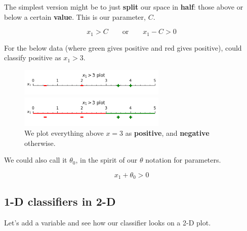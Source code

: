         The simplest version might be to just \textbf{split} our space in \textbf{half}: those above or below a certain \textbf{value}. This is our parameter, $C$.
        
        \begin{equation}
            x_1 > C \qquad \text{or} \qquad x_1 - C > 0
        \end{equation}
        
        \miniex For the below data (where green gives positive and red gives positive), could classify positive as $x_1>3$.
        
        \begin{figure}[H]
            \centering
            \includegraphics[width=70mm,scale=0.4]{images/classification_images/x1_1d_plot_points.png}

            \includegraphics[width=70mm,scale=0.4]{images/classification_images/x1_1d_plot.png}
            
            \caption*{We plot everything above $x=3$ as \textbf{positive}, and \textbf{negative} otherwise.}
        \end{figure}
        
        We could also call it $\theta_0$, in the spirit of our $\theta$ notation for parameters.
        
        \begin{equation}
            x_1 + \theta_0 > 0
        \end{equation}
    
    \subsection{1-D classifiers in 2-D}
        
        Let's add a variable and see how our classifier looks on a 2-D plot.
        
